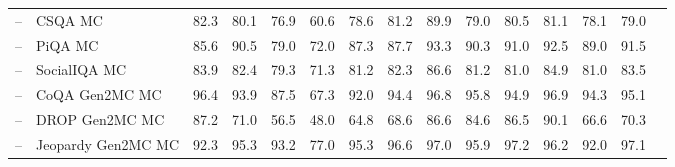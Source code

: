 \documentclass[table]{ai2style/ai2}
\begin{document}
\begin{table}[t]
{{\begin{NiceTabular}{@{}Hl
P{38pt}C{38pt}C{38pt}C{38pt}C{38pt}C{38pt}|C{38pt}C{38pt}C{38pt}C{38pt}C{38pt}C{38pt}H@{}}
 -- & CSQA MC                                                                                                & 82.3                    & 80.1               & 76.9                 & 60.6                 & 78.6                       & 81.2                  & 89.9                  & 79.0                 & 80.5                     & 81.1              & 78.1                 & 79.0                   \\
 -- & PiQA MC                                                                                                & 85.6                    & 90.5               & 79.0                 & 72.0                 & 87.3                       & 87.7                  & 93.3                  & 90.3                 & 91.0                     & 92.5              & 89.0                 & 91.5                   \\
 -- & SocialIQA MC                                                                                           & 83.9                    & 82.4               & 79.3                 & 71.3                 & 81.2                       & 82.3                  & 86.6                  & 81.2                 & 81.0                     & 84.9              & 81.0                 & 83.5                   \\
 -- & CoQA Gen2MC MC                                                                                         & 96.4                    & 93.9               & 87.5                 & 67.3                 & 92.0                       & 94.4                  & 96.8                  & 95.8                 & 94.9                     & 96.9              & 94.3                 & 95.1                   \\
 -- & DROP Gen2MC MC                                                                                         & 87.2                    & 71.0               & 56.5                 & 48.0                 & 64.8                       & 68.6                  & 86.6                  & 84.6                 & 86.5                     & 90.1              & 66.6                 & 70.3                   \\
 -- & Jeopardy Gen2MC MC                                                                                     & 92.3                    & 95.3               & 93.2                 & 77.0                 & 95.3                       & 96.6                  & 97.0                  & 95.9                 & 97.2                     & 96.2              & 92.0                 & 97.1                   \\

\end{NiceTabular}}}
\end{table}
\end{document}
